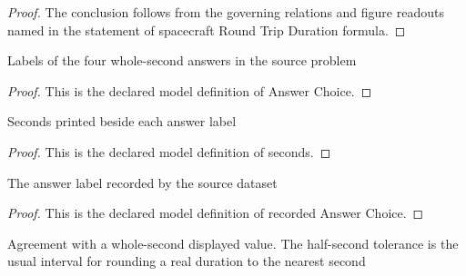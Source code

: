 \begin{proof}
  The conclusion follows from the governing relations and figure readouts named in the statement of spacecraft Round Trip Duration formula.
\end{proof}
\begin{definition}
  \label{def:physics:phyx-mini-0528:phyxminiproblems-problemphyxmini0528-answerchoice}
  Labels of the four whole-second answers in the source problem
\end{definition}
\begin{proof}
  This is the declared model definition of Answer Choice.
\end{proof}
\begin{definition}[seconds]
  \label{def:physics:phyx-mini-0528:phyxminiproblems-problemphyxmini0528-answerchoice-seconds}
  Seconds printed beside each answer label
\end{definition}
\begin{proof}
  This is the declared model definition of seconds.
\end{proof}
\begin{definition}
  \label{def:physics:phyx-mini-0528:phyxminiproblems-problemphyxmini0528-recordedanswerchoice}
  The answer label recorded by the source dataset
\end{definition}
\begin{proof}
  This is the declared model definition of recorded Answer Choice.
\end{proof}
\begin{definition}
  \label{def:physics:phyx-mini-0528:phyxminiproblems-problemphyxmini0528-matchesdisplayedtimechoice}
  Agreement with a whole-second displayed value. The half-second tolerance is the usual interval for rounding a real duration to the nearest second
\end{definition}
